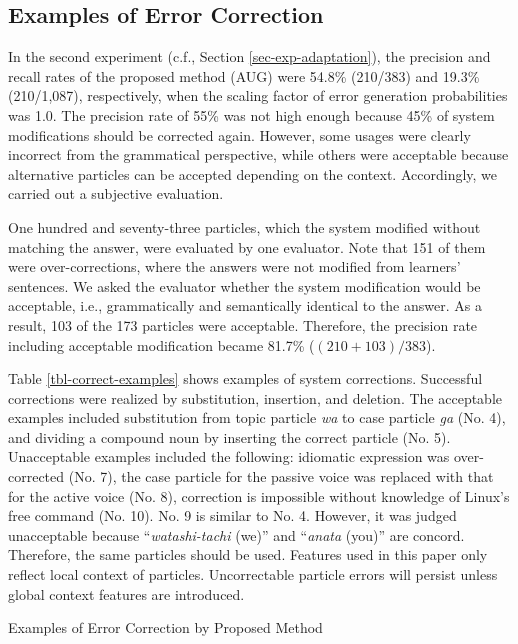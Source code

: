 \documentclass[english]{jnlp_1.4_rep}
\begin{document}
\subsection{Examples of Error Correction}

In the second experiment (c.f., Section \ref{sec-exp-adaptation}), the
precision and recall rates of the proposed method (AUG) were 54.8\%
(210/383) and 19.3\% (210/1,087), respectively, when the scaling factor
of error generation probabilities was 1.0. The precision rate of 55\%
was not high enough because 45\% of system modifications should be
corrected again. However, some usages were clearly incorrect from the
grammatical perspective, while others were acceptable because
alternative particles can be accepted depending on the
context. Accordingly, we carried out a subjective evaluation.

One hundred and seventy-three particles, which the system modified
without matching the answer, were evaluated by one evaluator. Note
that 151 of them were over-corrections, where the answers were not
modified from learners' sentences. We asked the evaluator whether the
system modification would be acceptable, i.e., grammatically and
semantically identical to the answer. As a result, 103 of the 173
particles were acceptable. Therefore, the precision rate including
acceptable modification became 81.7\% ($(210 + 103) / 383$).

Table \ref{tbl-correct-examples} shows examples of system
corrections. Successful corrections were realized by substitution,
insertion, and deletion. The acceptable examples included substitution
from topic particle \textit{wa} to case particle \textit{ga} (No. 4),
and dividing a compound noun by inserting the correct particle
(No. 5). Unacceptable examples included the following: idiomatic
expression was over-corrected (No. 7), the case particle for the
passive voice was replaced with that for the active voice (No. 8),
correction is impossible without knowledge of Linux's free command
(No. 10). No. 9 is similar to No. 4. However, it was judged
unacceptable because ``\textit{watashi-tachi} (we)'' and
``\textit{anata} (you)'' are concord. Therefore, the same particles
should be used. Features used in this paper only reflect local context
of particles. Uncorrectable particle errors will persist unless global
context features are introduced.

\begin{table}[t]
\caption{Examples of Error Correction by Proposed Method}
\label{tbl-correct-examples}

\end{table}
\end{document}
